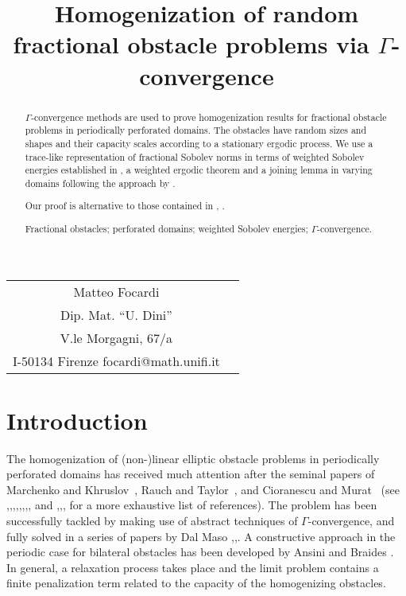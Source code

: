 \documentclass[10pt,reqno]{amsart}
\title[{$\Gamma$-convergence for random fractional obstacles}]
{Homogenization of random fractional obstacle problems via
$\Gamma$-convergence}
\numberwithin{equation}{section}
\begin{document}
\maketitle
\smallskip
\begin{center}
\begin{tabular}{c@{\qquad}c@{}}
Matteo Focardi \\[-0.3cm]
{\footnotesize Dip. Mat. ``U. Dini'' }
\\[-0.3cm]
{\footnotesize V.le Morgagni, 67/a}
\\[-0.3cm]
{\footnotesize I-50134  Firenze}
{\footnotesize focardi@math.unifi.it}
\end{tabular}
\end{center}
\medskip
\begin{abstract}
$\Gamma$-convergence methods are used to prove homogenization
results for fractional obstacle problems in periodically perforated 
domains.
The obstacles have random sizes and shapes and their
capacity scales according to a stationary ergodic process.
We use a trace-like representation of fractional
Sobolev norms in terms of weighted Sobolev energies established
in \cite{Caf-Silv}, a weighted ergodic theorem and a joining
lemma in varying domains following the approach by \cite{ANB}.

Our proof is alternative to those contained in \cite{Caf-Mel1},
\cite{Caf-Mel2}.
\vskip0.15cm

 Fractional obstacles; perforated domains;
weighted Sobolev energies; $\Gamma$-convergence.
\end{abstract}




\section{Introduction}\label{intro}

The homogenization of (non-)linear elliptic obstacle problems in
periodically perforated domains has received much attention after
the seminal papers of Marchenko and Khruslov~\cite{MK}, Rauch and
Taylor~\cite{RT1},\cite{RT2} and Cioranescu and Murat~\cite{CM} (see
\cite{CC},\cite{AP},\cite{DGDML},\cite{DML},\cite{DM1},\cite{DM2},\cite{DM3},\cite{LOPS},\cite{ANB} and \cite{ATT},\cite{BDF},\cite{CD},\cite{DM}
for a more exhaustive list of references).
The problem has been successfully tackled by making use of abstract 
techniques of $\Gamma$-convergence, and fully solved in a series of papers
by Dal Maso \cite{DM1},\cite{DM2},\cite{DM3}. %
A constructive approach in the periodic case for bilateral obstacles has
been developed by Ansini and Braides \cite{ANB}.
In general, a relaxation process takes place and the limit problem
contains a finite penalization term related to the capacity
of the homogenizing obstacles.
\end{document}
